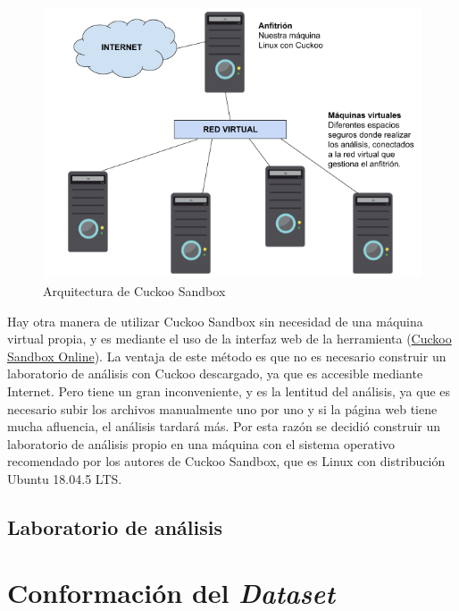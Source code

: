 \begin{figure}[!htb]
\begin{center}
\includegraphics[width=0.9\linewidth]{images/infraestructuracuckoo.png}
\end{center}
\caption{Arquitectura de Cuckoo Sandbox}
\label{fig:Diagrama}
\end{figure}

Hay otra manera de utilizar Cuckoo Sandbox sin necesidad de una máquina virtual propia, y es mediante el uso de la interfaz web de la herramienta (\href{https://cuckoo.cert.ee/}{Cuckoo Sandbox Online}). La ventaja de este método es que no es necesario construir un laboratorio de análisis con Cuckoo descargado, ya que es accesible mediante Internet. Pero tiene un gran inconveniente, y es la lentitud del análisis, ya que es necesario subir los archivos manualmente uno por uno y si la página web tiene mucha afluencia, el análisis tardará más. Por esta razón se decidió construir un laboratorio de análisis propio en una máquina con el sistema operativo recomendado por los autores de Cuckoo Sandbox, que es Linux con distribución Ubuntu 18.04.5 \gls{LTS}.

\subsection{Laboratorio de análisis} \label{sec:lab}




\section{Conformación del \textit{Dataset}} \label{sec:reports}

